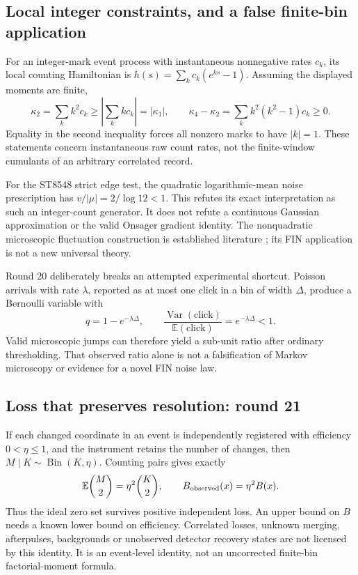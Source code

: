 \documentclass[11pt,a4paper]{article}
\newcommand{\E}{\mathbb E}
\begin{document}
\subsection{Local integer constraints, and a false finite-bin application}

For an integer-mark event process with instantaneous nonnegative rates
$c_k$, its local counting Hamiltonian is
$h(s)=\sum_kc_k(e^{ks}-1)$. Assuming the displayed moments are finite,
\[
 \kappa_2=\sum_k k^2c_k\ge|\sum_k kc_k|=|\kappa_1|,\qquad
 \kappa_4-\kappa_2=\sum_k k^2(k^2-1)c_k\ge0.
\]
Equality in the second inequality forces all nonzero marks to have
$|k|=1$. These statements concern instantaneous raw count rates, not the
finite-window cumulants of an arbitrary correlated record.

For the ST8548 strict edge test, the quadratic logarithmic-mean noise
prescription has $v/|\mu|=2/\log12<1$. This refutes its exact
interpretation as such an integer-count generator. It does not refute a
continuous Gaussian approximation or the valid Onsager gradient identity.
The nonquadratic microscopic fluctuation construction is established
literature \cite{mpr}; its FIN application is not a new universal theory.

Round 20 deliberately breaks an attempted experimental shortcut. Poisson
arrivals with rate $\lambda$, reported as at most one click in a bin of
width $\Delta$, produce a Bernoulli variable with
\[
 q=1-e^{-\lambda\Delta},\qquad
 \frac{\operatorname{Var}(\mathrm{click})}{\E(\mathrm{click})}
 =e^{-\lambda\Delta}<1.
\]
Valid microscopic jumps can therefore yield a sub-unit ratio after ordinary
thresholding. That observed ratio alone is not a falsification of Markov
microscopy or evidence for a novel FIN noise law.

\subsection{Loss that preserves resolution: round 21}

If each changed coordinate in an event is independently registered with
efficiency $0<\eta\le1$, and the instrument retains the number of changes,
then $M\mid K\sim\operatorname{Bin}(K,\eta)$. Counting pairs gives exactly
\[
 \E\binom M2=\eta^2\binom K2,
 \qquad B_{\rm observed}(x)=\eta^2 B(x).
\]
Thus the ideal zero set survives positive independent loss. An upper bound
on $B$ needs a known lower bound on efficiency. Correlated losses, unknown
merging, afterpulses, backgrounds or unobserved detector recovery states are
not licensed by this identity. It is an event-level identity, not an
uncorrected finite-bin factorial-moment formula.
\end{document}
